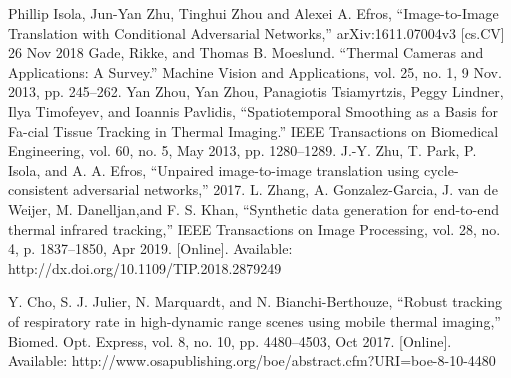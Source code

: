 \documentclass[conference]{IEEEtran}
\begin{document}
\begin{thebibliography}{00}
 Phillip Isola, Jun-Yan Zhu, Tinghui Zhou and Alexei A. Efros, “Image-to-Image Translation with Conditional Adversarial Networks,” arXiv:1611.07004v3 [cs.CV] 26 Nov 2018
 Gade, Rikke, and Thomas B. Moeslund. “Thermal Cameras and Applications: A Survey.” Machine Vision and Applications, vol. 25, no. 1, 9 Nov. 2013, pp. 245–262.
 Yan Zhou, Yan Zhou, Panagiotis Tsiamyrtzis, Peggy Lindner, Ilya Timofeyev, and Ioannis Pavlidis, “Spatiotemporal Smoothing as a Basis for Fa-cial Tissue Tracking in Thermal Imaging.” IEEE Transactions on Biomedical Engineering, vol. 60, no. 5, May 2013, pp. 1280–1289.
 J.-Y. Zhu, T. Park, P. Isola, and A. A. Efros, “Unpaired image-to-image translation using cycle-consistent adversarial networks,” 2017.
 L. Zhang, A. Gonzalez-Garcia, J. van de Weijer, M. Danelljan,and F. S. Khan, “Synthetic data generation for end-to-end
thermal infrared tracking,” IEEE Transactions on Image Processing, vol. 28, no. 4, p. 1837–1850, Apr 2019. [Online]. Available: http://dx.doi.org/10.1109/TIP.2018.2879249

 Y. Cho, S. J. Julier, N. Marquardt, and N. Bianchi-Berthouze, “Robust tracking of respiratory rate in high-dynamic range
scenes using mobile thermal imaging,” Biomed. Opt. Express, vol. 8, no. 10, pp. 4480–4503, Oct 2017. [Online]. Available: http://www.osapublishing.org/boe/abstract.cfm?URI=boe-8-10-4480


\end{thebibliography}
\end{document}
